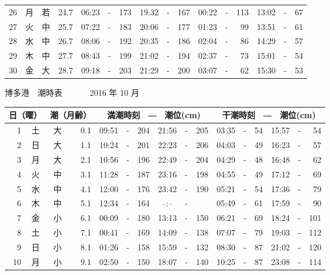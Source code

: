 \documentclass[12pt.a4j]{jsarticle}
\begin{document}
\begin{center}
\begin{table}[ht]
\begin{tabular}{|rc|cr|ccrccr|ccrccr|}
26 & 月 & 若 & 24.7 &  06:23 &-& 173  &  19:32 &-& 167  &   00:22 &-& 113  &   13:02 &-&  67  \\
27 & 火 & 中 & 25.7 &  07:22 &-& 183  &  20:06 &-& 177  &   01:23 &-&  99  &   13:51 &-&  61  \\
28 & 水 & 中 & 26.7 &  08:06 &-& 192  &  20:35 &-& 186  &   02:04 &-&  86  &   14:29 &-&  57  \\
29 & 木 & 中 & 27.7 &  08:43 &-& 199  &  21:02 &-& 194  &   02:37 &-&  73  &   15:01 &-&  54  \\
30 & 金 & 大 & 28.7 &  09:18 &-& 203  &  21:29 &-& 200  &   03:07 &-&  62  &   15:30 &-&  53  \\
   \hline
   \end{tabular}
\end{table}
\newpage
 {\LARGE 博多港　潮時表　　　}
 {\large 2016 年 10 月}\\
 \begin{table}[ht]
    \begin{tabular}{|rc|cr|ccrccr|ccrccr|}
    \hline
    \multicolumn{2}{|c|}{日（曜）} & \multicolumn{2}{c|}{潮（月齢）} & \multicolumn{6}{c|}{満潮時刻　―　潮位(cm)} & \multicolumn{6}{c|}{干潮時刻　―　潮位(cm)} \\
 \hline
 1 & 土 & 大 &  0.1 &  09:51 &-& 204  &  21:56 &-& 205  &   03:35 &-&  54  &   15:57 &-&  54  \\
 2 & 日 & 大 &  1.1 &  10:24 &-& 201  &  22:23 &-& 206  &   04:03 &-&  49  &   16:23 &-&  57  \\
 3 & 月 & 大 &  2.1 &  10:56 &-& 196  &  22:49 &-& 204  &   04:29 &-&  48  &   16:48 &-&  62  \\
 4 & 火 & 中 &  3.1 &  11:28 &-& 187  &  23:16 &-& 198  &   04:55 &-&  49  &   17:12 &-&  69  \\
 5 & 水 & 中 &  4.1 &  12:00 &-& 176  &  23:42 &-& 190  &   05:21 &-&  54  &   17:36 &-&  79  \\
 6 & 木 & 中 &  5.1 &  12:34 &-& 164  &  --:-- &-&     &   05:49 &-&  61  &   17:59 &-&  90  \\
 7 & 金 & 小 &  6.1 &  00:09 &-& 180  &  13:13 &-& 150  &   06:21 &-&  69  &   18:24 &-& 101  \\
 8 & 土 & 小 &  7.1 &  00:41 &-& 169  &  14:09 &-& 138  &   07:07 &-&  79  &   19:03 &-& 112  \\
 9 & 日 & 小 &  8.1 &  01:26 &-& 158  &  15:59 &-& 132  &   08:30 &-&  87  &   21:02 &-& 120  \\
10 & 月 & 小 &  9.1 &  02:50 &-& 150  &  18:07 &-& 140  &   10:25 &-&  87  &   23:08 &-& 114  \\

\end{tabular}
\end{table}
\end{center}
\end{document}
